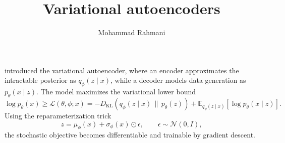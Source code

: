 \documentclass[a4paper]{article}
\title{Variational autoencoders}
\date{}
\author{Mohammad Rahmani}
\begin{document}
    \maketitle
    \cite{kingma-2013-auto-encoding-variational-bayes} introduced the variational autoencoder, where an encoder approximates the intractable posterior as \(q_{\phi}(z \mid x)\), while a decoder models data generation as \(p_{\theta}(x \mid z)\).
    The model maximizes the variational lower bound
    \[
        \log p_{\theta}(x) \geq \mathcal{L}(\theta,\phi;x)
        = -D_{\mathrm{KL}}\!\left(q_{\phi}(z \mid x)\,\|\,p_{\theta}(z)\right)
        + \mathbb{E}_{q_{\phi}(z \mid x)}[\log p_{\theta}(x \mid z)] .
    \]
    Using the reparameterization trick
    \[
        z = \mu_{\phi}(x) + \sigma_{\phi}(x)\odot \epsilon,
        \qquad \epsilon \sim \mathcal{N}(0,I),
    \]
    the stochastic objective becomes differentiable and trainable by gradient descent.
    
    
\end{document}
